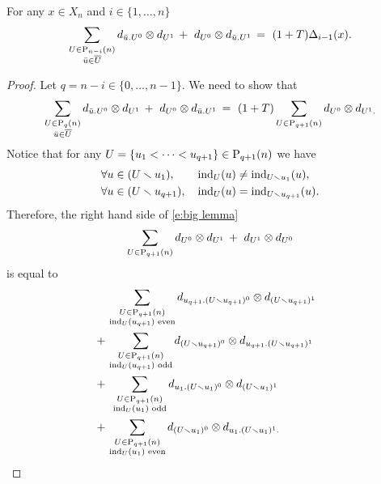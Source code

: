\begin{lemma} \label{l:big lemma}
	For any $x \in X_n$ and $i \in \{1, \dots, n\}$
	\begin{equation}
	\sum_{\substack{U \in \P_{n-i}(n) \\ \bu \in \overline{U}}} d_{\bu.U^0} \otimes d_{U^1}\, +\ d_{U^0} \otimes d_{\bu.U^1}\, = \
	(1+T) \Delta_{i-1}(x).
	\end{equation}
\end{lemma}

\begin{proof}
	Let $q = n-i \in \{0, \dots, n-1\}$.
	We need to show that
	\begin{equation} \label{e:big lemma}
	\sum_{\substack{U \in \P_{q}(n) \\ \bu \in \overline{U}}} d_{\bu.U^0} \otimes d_{U^1}\, +\ d_{U^0} \otimes d_{\bu.U^1}\, = \
	(1+T) \sum_{U \in \P_{q+1}(n)} d_{U^0} \otimes d_{U^1.}
	\end{equation}
	Notice that for any $U = \{u_1 < \cdots < u_{q+1}\} \in \P_{q+1}(n)$ we have
	\begin{align*}
	& \forall u \in (U \sm u_1), \qquad \ind_{U}(u) \neq \ind_{U \sm u_1}(u), \\
	& \forall u \in (U \sm u_{q+1}), \quad \ind_{U}(u) = \ind_{U \sm u_{q+1}}(u).
	\end{align*}
	Therefore, the right hand side of \eqref{e:big lemma}
	\begin{equation} \label{e:big lemma rhs}
	\sum_{U \in \P_{q+1}(n)} d_{U^0} \otimes d_{U^1}\, +\ d_{U^1} \otimes d_{U^0}
	\end{equation}
	is equal to
	\begin{equation} \label{e:big lemma rhs w/o endpoints}
	\begin{split}
	&\, \sum_{\substack{U \in \P_{q+1}(n) \\ \ind_U(u_{q+1}) \text{ even}}}
	d_{u_{q+1}.(U \sm u_{q+1})^0} \otimes d_{(U \sm u_{q+1})^1}\ \ \\ +
	&\, \sum_{\substack{U \in \P_{q+1}(n) \\ \ind_U(u_{q+1}) \text{ odd}}}
	d_{(U \sm u_{q+1})^0} \otimes d_{u_{q+1}.(U \sm u_{q+1})^1} \\ +
	&\ \,\sum_{\substack{U \in \P_{q+1}(n) \\ \ind_U(u_1) \text{ odd}}} d_{u_1.(U \sm u_1)^0} \otimes d_{(U\sm u_1)^1} \quad \\ +
	&\, \sum_{\substack{U \in \P_{q+1}(n) \\ \ind_U(u_1) \text{ even}}} d_{(U \sm u_1)^0} \otimes d_{u_1.(U\sm u_1)^1.}
	\end{split}
	\end{equation}


\end{proof}
